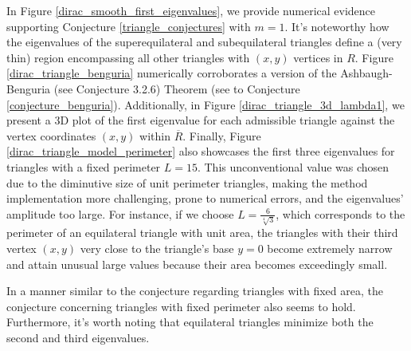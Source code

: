 In Figure \ref{dirac_smooth_first_eigenvalues}, we provide numerical evidence supporting Conjecture \ref{triangle_conjectures} with \(m=1\). It's noteworthy how the eigenvalues of the superequilateral and subequilateral triangles define a (very thin) region encompassing all other triangles with \((x, y)\) vertices in \(R\). Figure \ref{dirac_triangle_benguria} numerically corroborates a version of the Ashbaugh-Benguria (see Conjecture 3.2.6) Theorem
(see to Conjecture \ref{conjecture_benguria}). Additionally, in Figure \ref{dirac_triangle_3d_lambda1}, we present a 3D plot of the first eigenvalue for each admissible triangle against the vertex coordinates \((x,y)\) within \(\overline{R}\). Finally, Figure \ref{dirac_triangle_model_perimeter} also showcases the first three eigenvalues for triangles with a fixed perimeter \(L = 15\). This unconventional value was chosen due to the diminutive size of unit perimeter triangles, making the method implementation more challenging, prone to numerical errors, and the eigenvalues' amplitude too large. For instance, if we choose \(L = \frac{6}{\sqrt[4]{3}}\), which corresponds to the perimeter of an equilateral triangle with unit area, the triangles with their third vertex \((x,y)\) very close to the triangle's base \(y=0\) become extremely narrow and attain unusual large values because their area becomes exceedingly small.

In a manner similar to the conjecture regarding triangles with fixed area, the conjecture concerning triangles with fixed perimeter also seems to hold. Furthermore, it's worth noting that equilateral triangles minimize both the second and third eigenvalues.


